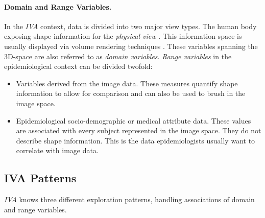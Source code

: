 \documentclass[journal]{style/vgtc} 			          %
\begin{document}
\paragraph{Domain and Range Variables. }
In the \emph{IVA} context, data is divided into two major view types.
%
The human body exposing shape information for the \emph{physical view} \cite{Oeltze2013}.
%
This information space is usually displayed via volume rendering techniques \cite{Oeltze2007}.
%
%
These variables spanning the 3D-space are also referred to as \emph{domain variables}.
%
\emph{Range variables} in the epidemiological context can be divided twofold:
%
\begin{itemize}
	\item Variables derived from the image data. 
	These measures quantify shape information to allow for comparison and can also be used to brush in the image space.
	\item Epidemiological socio-demographic or medical attribute data.
	These values are associated with every subject represented in the image space. 
	They do not describe shape information.
	This is the data epidemiologists usually want to correlate with image data.
\end{itemize}
%
% 

\subsection{IVA Patterns}
%
\emph{IVA} knows three different exploration patterns, handling associations of domain and range variables.
\end{document}
